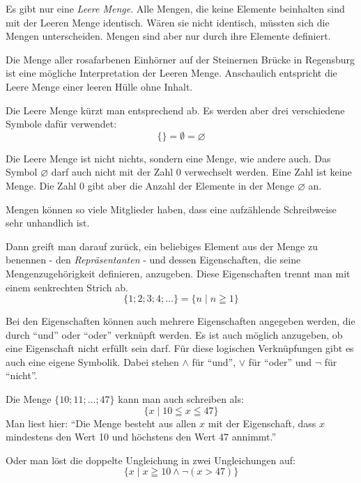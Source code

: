 \begin{defi}
 Es gibt nur eine \emph{Leere Menge}. Alle Mengen, die keine Elemente beinhalten sind mit der Leeren Menge identisch. Wären sie nicht identisch, müssten sich die Mengen unterscheiden. Mengen sind aber nur durch ihre Elemente definiert.

Die Menge aller rosafarbenen Einhörner auf der Steinernen Brücke in Regensburg ist eine mögliche Interpretation der Leeren Menge. Anschaulich entspricht die Leere Menge einer leeren Hülle ohne Inhalt.

Die Leere Menge kürzt man entsprechend ab. Es werden aber drei verschiedene Symbole dafür verwendet:
\begin{equation*}
 \lbrace \rbrace = \emptyset = \varnothing
\end{equation*}

Die Leere Menge ist nicht nichts, sondern eine Menge, wie andere auch. Das Symbol \(\varnothing\) darf auch nicht mit der Zahl 0 verwechselt werden. Eine Zahl ist keine Menge. Die Zahl 0 gibt aber die Anzahl der Elemente in der Menge \(\varnothing\) an.
\end{defi}

\begin{regel}
 Mengen können so viele Mitglieder haben, dass eine aufzählende Schreibweise sehr unhandlich ist.

Dann greift man darauf zurück, ein beliebiges Element aus der Menge zu benennen - den \emph{Repräsentanten} - und dessen Eigenschaften, die seine Mengenzugehörigkeit definieren, anzugeben. Diese Eigenschaften trennt man mit einem senkrechten Strich ab.
\begin{equation*}
 \lbrace 1;2;3;4;\ldots \rbrace = \lbrace n \mid n\geqq 1\rbrace
\end{equation*}

Bei den Eigenschaften können auch mehrere Eigenschaften angegeben werden, die durch "`und"' oder "`oder"' verknüpft werden. Es ist auch möglich anzugeben, ob eine Eigenschaft nicht erfüllt sein darf. Für diese logischen Verknüpfungen gibt es auch eine eigene Symbolik. Dabei stehen \(\wedge\) für "`und"', \(\vee\) für "`oder"' und \(\lnot\) für "`nicht"'.
\end{regel}

\begin{bsp}
 Die Menge \(\lbrace 10;11;\ldots;47\rbrace\) kann man auch schreiben als:
 \begin{equation*}
  \lbrace x \mid 10 \leqq x \leqq 47\rbrace
 \end{equation*}
 Man liest hier: "`Die Menge besteht aus allen \(x\) mit der Eigenschaft, dass \(x\) mindestens den Wert 10 und höchstens den Wert 47 annimmt."'
 
 Oder man löst die doppelte Ungleichung in zwei Ungleichungen auf:
 \begin{equation*}
  \lbrace x \mid x\geqq 10 \wedge \neg (x>47)\rbrace
 \end{equation*}
\end{bsp}

